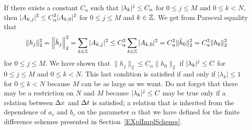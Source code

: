 If there exists a constant $C_\alpha$ such that
$\displaystyle |\lambda_k|^j \leq C_\alpha$ for
$0 \leq j \leq M$ and $0 \leq k <N$,
then $\displaystyle |A_{k,j}|^2 \leq C_\alpha^2 |A_{k,0}|^2$ for
$0 \leq j \leq M$ and $k \in \mathbb{Z}$.  We get from Parseval equality that
\[
\|h_j\|_2^2 = \left\|\hat{h}_j\right\|_2^2
= \sum_{k\in \mathbb{Z}} |A_{k,j}|^2 \leq C_\alpha^2 \sum_{k\in \mathbb{Z}} |A_{k,0}|^2
= C_\alpha^2 \|\hat{h}_0\|_2^2 = C_\alpha^2 \|h_0\|_2^2
\]
for $0 \leq j \leq M$.
We have shown that $\|h_j\|_2 \leq C_\alpha \|h_0\|_2$ if
$\displaystyle |\lambda_k|^j \leq C$ for $0 \leq j \leq M$ and $0 \leq k < N$.
This last condition is satisfied if and only if
$|\lambda_k| \leq 1$ for $0\leq k < N$ because $M$ can be as
large as we want.  Do not forget that there may be a restriction on
$N$ and $M$ because $\displaystyle |\lambda_k|^j \leq C$ may be true only if
a relation between $\Delta{x}$ and $\Delta{t}$ is satisfied; a relation
that is inherited from the dependence of $a_r$ and $b_r$ on the
parameter $\alpha$ that we have defined for the finite difference
schemes presented in Section~\ref{EXplImplSchenes}.

